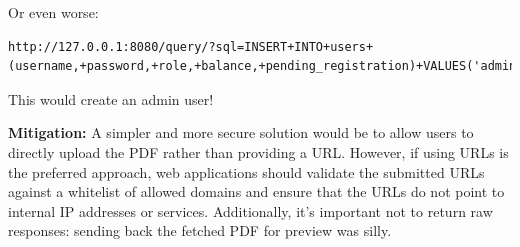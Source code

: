 \documentclass[]{article}
\begin{document}
Or even worse:
\begin{lstlisting}
http://127.0.0.1:8080/query/?sql=INSERT+INTO+users+(username,+password,+role,+balance,+pending_registration)+VALUES('adminr',+'adminr',+'admin',+0,+'false')
\end{lstlisting}

This would create an admin user!

\textbf{Mitigation:}
A simpler and more secure solution would be to allow users to directly upload the PDF rather than providing a URL. However, if using URLs is the preferred approach, web applications should validate the submitted URLs against a whitelist of allowed domains and ensure that the URLs do not point to internal IP addresses or services. Additionally, it's important not to return raw responses: sending back the fetched PDF for preview was silly.
\end{document}
